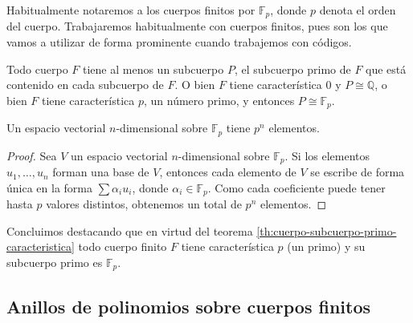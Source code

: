 Habitualmente notaremos a los cuerpos finitos por \(\mathbb F_p\), donde \(p\) denota el orden del cuerpo.
Trabajaremos habitualmente con cuerpos finitos, pues son los que vamos a utilizar de forma prominente cuando trabajemos con códigos.

\begin{theorem}
  \label{th:cuerpo-subcuerpo-primo-caracteristica}
  Todo cuerpo \(F\) tiene al menos un subcuerpo \(P\), el subcuerpo primo de \(F\) que está contenido en cada subcuerpo de \(F\).
  O bien \(F\) tiene característica \(0\) y \(P \cong \mathbb Q\), o bien \(F\) tiene característica \(p\), un número primo, y entonces \(P \cong \mathbb F_p\).
\end{theorem}




\begin{lemma}
  Un espacio vectorial \(n\)-dimensional sobre \(\mathbb F_p\) tiene \(p^n\) elementos.
\end{lemma}

\begin{proof}
  Sea \(V\) un espacio vectorial \(n\)-dimensional sobre \(\mathbb F_p\).
  Si los elementos \(u_1, \dots, u_n\) forman una base de \(V\), entonces cada elemento de \(V\) se escribe de forma única en la forma \(\sum \alpha_iu_i\), donde \(\alpha_i \in \mathbb F_p\).
  Como cada coeficiente puede tener hasta \(p\) valores distintos, obtenemos un total de \(p^n\) elementos.
\end{proof}

Concluimos destacando que en virtud del teorema \ref{th:cuerpo-subcuerpo-primo-caracteristica} todo cuerpo finito \(F\) tiene característica \(p\) (un primo) y su subcuerpo primo es \(\mathbb F_p\).


\subsection{Anillos de polinomios sobre cuerpos finitos}

